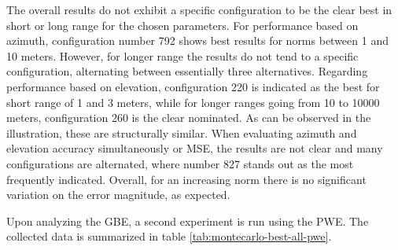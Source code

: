 The overall results do not exhibit a specific configuration to be the clear best in short or long range for the chosen parameters. For performance based on azimuth, configuration number 792 shows best results for norms between 1 and 10 meters. However, for longer range the results do not tend to a specific configuration, alternating between essentially three alternatives. Regarding performance based on elevation, configuration 220 is indicated as the best for short range of 1 and 3 meters, while for longer ranges going from 10 to 10000 meters, configuration 260 is the clear nominated. As can be observed in the illustration, these are structurally similar. When evaluating azimuth and elevation accuracy simultaneously or MSE, the results are not clear and many configurations are alternated, where number 827 stands out as the most frequently indicated. Overall, for an increasing norm there is no significant variation on the error magnitude, as expected.

Upon analyzing the GBE, a second experiment is run using the PWE. The collected data is summarized in table \ref{tab:montecarlo-best-all-pwe}.

